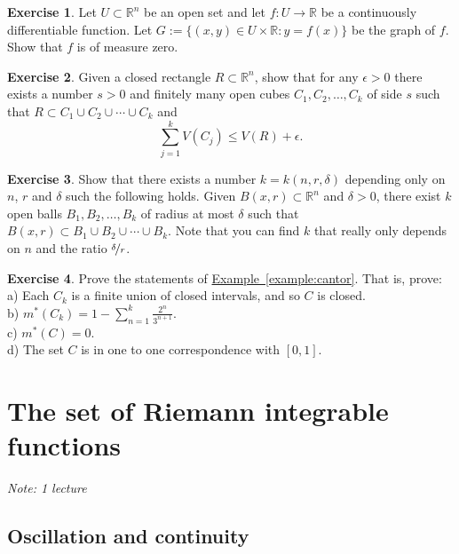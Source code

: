\documentclass[12pt]{book}
\newcommand{\R}{{\mathbb{R}}}
\newcommand{\sectionnotes}[1]{\noindent \emph{Note: #1} \medskip \par}
\newcommand{\sectionnewpage}{\clearpage}
\theoremstyle{plain}
\theoremstyle{remark}
\theoremstyle{definition}
\theoremstyle{exercise}
\newtheorem{exercise}{Exercise}[section]
\theoremstyle{example}
\newcommand{\exampleref}[1]{\hyperref[#1]{Example~\ref*{#1}}}
\begin{document}
\begin{exercise}
Let $U \subset \R^n$ be an open set
and let $f \colon U \to \R$ be a continuously differentiable function.
Let $G := \{ (x,y) \in U \times \R : y = f(x) \}$ be the graph of $f$.
Show that $f$ is of measure zero.
\end{exercise}

\begin{exercise}
Given a closed rectangle $R \subset \R^n$, show that for any $\epsilon > 0$
there exists a number $s > 0$ and finitely many open cubes $C_1,C_2,\ldots,C_k$
of side $s$ such that
$R \subset C_1 \cup C_2 \cup \cdots \cup C_k$
and
\begin{equation*}
\sum_{j=1}^k V(C_j) \leq V(R) + \epsilon .
\end{equation*}
\end{exercise}

\begin{exercise}
Show that there exists a number $k = k(n,r,\delta)$ depending only on $n$,
$r$ and $\delta$ such
the following holds.
Given $B(x,r) \subset \R^n$ and $\delta > 0$, there exist
$k$ open balls $B_1,B_2,\ldots,B_k$ of radius at most
$\delta$ such that $B(x,r) \subset B_1 \cup B_2 \cup \cdots \cup B_k$.
Note that you can find $k$ that really only depends on $n$ and the ratio
$\nicefrac{\delta}{r}$.
\end{exercise}

\begin{exercise}
Prove the statements of \exampleref{example:cantor}.  That is,
prove:\\
a) Each $C_k$ is a finite union of closed intervals, and so $C$ is closed.
\\
b) $m^*(C_k) =1 - \sum_{n=1}^k \frac{2^n}{3^{n+1}}$.
\\
c) $m^*(C) = 0$.
\\
d)
The set $C$ is in one to one correspondence with $[0,1]$.
\end{exercise}



\sectionnewpage
\section{The set of Riemann integrable functions }
\label{sec:riemannlebesgue}

\sectionnotes{1 lecture}

\subsection{Oscillation and continuity}
\end{document}
